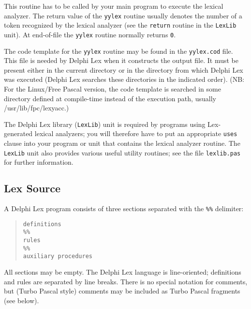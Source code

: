 \documentclass{article}
\begin{document}
This routine has to be called by your main program to execute the lexical
analyzer. The return value of the \verb"yylex" routine usually denotes the
number of a token recognized by the lexical analyzer (see the \verb"return"
routine in the \verb"LexLib" unit). At end-of-file the \verb"yylex" routine
normally returns \verb"0".

The code template for the \verb"yylex" routine may be found in the
\verb"yylex.cod" file. This file is needed by Delphi Lex when it constructs the
output file. It must be present either in the current directory or in the
directory from which Delphi Lex was executed (Delphi Lex searches these directories in
the indicated order). (NB: For the Linux/Free Pascal version, the code
template is searched in some directory defined at compile-time instead of the
execution path, usually /usr/lib/fpc/lexyacc.)

The Delphi Lex library (\verb"LexLib") unit is required by programs using
Lex-generated lexical analyzers; you will therefore have to put an appropriate
\verb"uses" clause into your program or unit that contains the lexical
analyzer routine. The \verb"LexLib" unit also provides various useful utility
routines; see the file \verb"lexlib.pas" for further information.

\subsection{Lex Source}

A Delphi Lex program consists of three sections separated with the \verb"%%"
delimiter:

\begin{quote}\begin{verbatim}
definitions
%%
rules
%%
auxiliary procedures
\end{verbatim}\end{quote}

All sections may be empty. The Delphi Lex language is line-oriented; definitions
and rules are separated by line breaks. There is no special notation for
comments, but (Turbo Pascal style) comments may be included as Turbo Pascal
fragments (see below).
\end{document}
